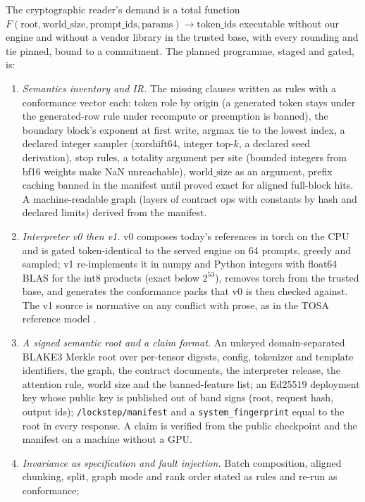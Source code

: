 \documentclass{article}
\begin{document}
The cryptographic reader's demand is a total function $F(\mathrm{root},\mathrm{world\_size},
\mathrm{prompt\_ids},\mathrm{params})\to\mathrm{token\_ids}$ executable without our engine and
without a vendor library in the trusted base, with every rounding and tie pinned, bound to a
commitment.  The planned programme, staged and gated, is:
\begin{enumerate}
  \item \emph{Semantics inventory and IR.}  The missing clauses written as rules with a
  conformance vector each: token role by origin (a generated token stays under the
  generated-row rule under recompute or preemption is banned), the boundary block's exponent
  at first write, argmax tie to the lowest index, a declared integer sampler (xorshift64,
  integer top-$k$, a declared seed derivation), stop rules, a totality argument per site
  (bounded integers from bf16 weights make NaN unreachable), $\mathrm{world\_size}$ as an
  argument, prefix caching banned in the manifest until proved exact for aligned full-block
  hits.  A machine-readable graph (layers of contract ops with constants by hash and declared
  limits) derived from the manifest.
  \item \emph{Interpreter v0 then v1.}  v0 composes today's references in torch on the CPU
  and is gated token-identical to the served engine on 64 prompts, greedy and sampled; v1
  re-implements it in numpy and Python integers with float64 BLAS for the int8 products
  (exact below $2^{53}$), removes torch from the trusted base, and generates the conformance
  packs that v0 is then checked against.  The v1 source is normative on any conflict with
  prose, as in the TOSA reference model \cite{tosa}.
  \item \emph{A signed semantic root and a claim format.}  An unkeyed domain-separated BLAKE3
  Merkle root over per-tensor digests, config, tokenizer and template identifiers, the graph,
  the contract documents, the interpreter release, the attention rule, world size and the
  banned-feature list; an Ed25519 deployment key whose public key is published out of band
  signs (root, request hash, output ids); \texttt{/lockstep/manifest} and a
  \texttt{system\_fingerprint} equal to the root in every response.  A claim is verified from
  the public checkpoint and the manifest on a machine without a GPU.
  \item \emph{Invariance as specification and fault injection.}  Batch composition, aligned
  chunking, split, graph mode and rank order stated as rules and re-run as conformance;

\end{enumerate}
\end{document}

